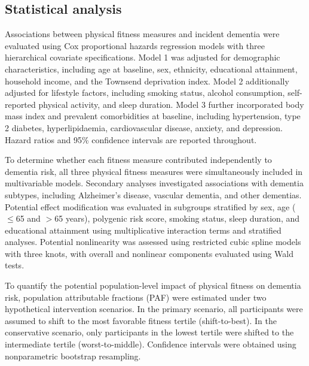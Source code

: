 \documentclass{article}
\begin{document}
\subsection*{Statistical analysis}
\label{sec:stat_analysis}
Associations between physical fitness measures and incident dementia were evaluated using Cox proportional hazards regression models with three hierarchical covariate specifications. Model 1 was adjusted for demographic characteristics, including age at baseline, sex, ethnicity, educational attainment, household income, and the Townsend deprivation index. Model 2 additionally adjusted for lifestyle factors, including smoking status, alcohol consumption, self-reported physical activity, and sleep duration. Model 3 further incorporated body mass index and prevalent comorbidities at baseline, including hypertension, type 2 diabetes, hyperlipidaemia, cardiovascular disease, anxiety, and depression. Hazard ratios and 95\% confidence intervals are reported throughout.

To determine whether each fitness measure contributed independently to dementia risk, all three physical fitness measures were simultaneously included in multivariable models. Secondary analyses investigated associations with dementia subtypes, including Alzheimer's disease, vascular dementia, and other dementias. Potential effect modification was evaluated in subgroups stratified by sex, age ($\leq$65 and $>$65 years), polygenic risk score, smoking status, sleep duration, and educational attainment using multiplicative interaction terms and stratified analyses. Potential nonlinearity was assessed using restricted cubic spline models with three knots, with overall and nonlinear components evaluated using Wald tests.

To quantify the potential population-level impact of physical fitness on dementia risk, population attributable fractions (PAF) were estimated under two hypothetical intervention scenarios. In the primary scenario, all participants were assumed to shift to the most favorable fitness tertile (shift-to-best). In the conservative scenario, only participants in the lowest tertile were shifted to the intermediate tertile (worst-to-middle). Confidence intervals were obtained using nonparametric bootstrap resampling.
\end{document}
